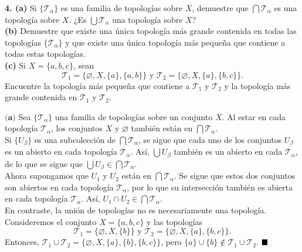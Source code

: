 \documentclass{article}
\begin{document}
\begin{mybox}
	\textbf{4. (a)} Si $\{ \mathcal{T_{\alpha}} \}$ es una familia de topologías sobre $X$, demuestre que $\bigcap \mathcal{T_{\alpha}}$ es una topología sobre $X$.  ¿Es $\bigcup \mathcal{T}_{\alpha}$ una topología sobre $X$? \\
	
	\textbf{(b)} Demuestre que existe una única topología más grande contenida en todas las topologías $\{\mathcal{T}_{\alpha} \}$ y que existe una única topología más pequeña que contiene a todas estas topologías. \\
	
	\textbf{(c)} Si $X = \{a, b, c \}$, sean 
	$$ \mathcal{T}_{1} = \{ \varnothing, X, \{a \}, \{a, b \} \} \text{ y } \mathcal{T}_{2} = \{ \varnothing, X, \{a \}, \{b, c \} \}.$$
	Encuentre la topología más pequeña que contiene a $\mathcal{T}_{1}$ y $\mathcal{T}_{2}$ y la topología más grande contenida en $\mathcal{T}_{1}$ y $\mathcal{T}_{2}$.
\end{mybox}	

$ \textbf{(a)}$ Sea $\{ \mathcal{T_{\alpha}}\}$ una familia de topologías sobre un conjunto $X$. Al estar en cada topología $\mathcal{T_{\alpha}}$, los conjuntos $X$ y $\varnothing$ también están en $\bigcap \mathcal{T_{\alpha}}$. \\
Si $\{U_{\beta} \}$ es una subcolección de $ \bigcap \mathcal{T}_{\alpha}$, se sigue que cada uno de los conjuntos $U_{\beta}$ es un abierto en cada topología $\mathcal{T_{\alpha}}$. Así, $\bigcup U_{\beta}$ también es un abierto en cada $\mathcal{T}_{\alpha}$, de lo que se sigue que $\bigcup U_{\beta} \in \bigcap \mathcal{T}_{\alpha}.$ \\
Ahora supongamos que $U_{1}$ y $U_{2}$ están en $\bigcap \mathcal{T_{\alpha}}$. Se sigue que estos dos conjuntos son abiertos en cada topología $\mathcal{T}_{\alpha}$, por lo que su intersección también es abierta en cada topología $\mathcal{T}_{\alpha}$. Así, $U_{1} \cap U_{2} \in \bigcap \mathcal{T_{\alpha}}$. \\

En contraste, la unión de topologías no es necesariamente una topología. Consideremos el conjunto $X = \{ a, b, c\}$ y las topologías
$$ \mathcal{T}_{1} = \{ \varnothing, X, \{ b \}  \} \text{ y  } \mathcal{T}_{2} = \{ \varnothing, X, \{ a \}, \{ b, c \}  \} .$$
Entonces, $\mathcal{T}_{1} \cup \mathcal{T}_{2} = \{ \varnothing, X, \{ a \}, \{ b \}, \{ b, c \} \}$, pero $\{ a \} \cup \{ b \} \notin \mathcal{T}_{1} \cup \mathcal{T}_{2}$. $\hspace*{\fill} \blacksquare$\\
\end{document}
